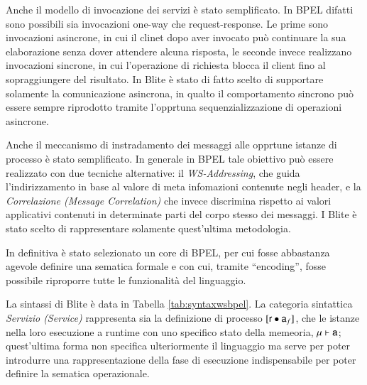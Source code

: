 Anche il modello di invocazione dei servizi è stato semplificato. In BPEL difatti
sono possibili sia invocazioni one-way che request-response. Le prime sono
invocazioni asincrone, in cui il clinet dopo aver invocato può continuare la sua
elaborazione senza dover attendere alcuna risposta, le seconde invece realizzano
invocazioni sincrone, in cui l'operazione di richiesta blocca il client fino al
sopraggiungere del risultato. In Blite è stato di fatto scelto di supportare
solamente la comunicazione asincrona, in qualto il comportamento sincrono può
essere sempre riprodotto tramite l'opprtuna sequenzializzazione di operazioni
asincrone.

Anche il meccanismo di instradamento dei messaggi alle opprtune istanze di
processo è stato semplificato. In generale in BPEL tale obiettivo può essere
realizzato con due tecniche alternative: il \emph{WS-Addressing}, che guida
l'indirizzamento in base al valore di meta infomazioni
contenute negli header, e la \emph{Correlazione (Message
Correlation)} che invece discrimina rispetto ai valori applicativi contenuti in
determinate parti del corpo stesso dei messaggi. I Blite è stato scelto di
rappresentare solamente quest'ultima metodologia. 

In definitiva è stato selezionato un core di BPEL, per cui fosse abbastanza
agevole definire una sematica formale e con cui, tramite ``encoding'', fosse
possibile riproporre tutte le funzionalità del linguaggio.

La sintassi di Blite è data in Tabella \ref{tab:syntaxwsbpel}. La categoria
sintattica \emph{Servizio (Service)} rappresenta  sia la definizione di
processo $[{\sf r} \bullet {\sf a}_f]$, che le istanze nella loro esecuzione a runtime
con uno specifico stato della memeoria, ${\sf \mu} \vdash {\sf a}$; quest'ultima
forma non specifica ulteriormente il linguaggio ma serve per poter introdurre
una rappresentazione della fase di esecuzione indispensabile per
poter definire la sematica operazionale.

